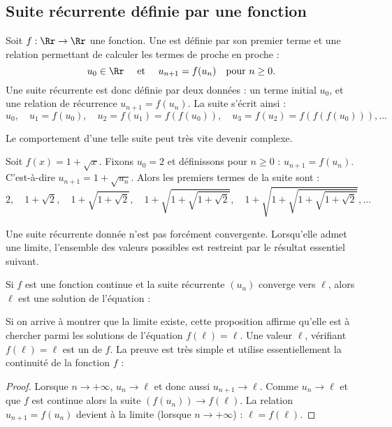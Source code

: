 \documentclass[class=report,crop=false]{standalone}
\begin{document}
\subsection{Suite récurrente définie par une fonction}

Soit $f : \Rr \to \Rr$ une fonction. Une  
est définie par son premier terme et une relation permettant de calculer les termes de proche en proche :
$$u_0 \in \Rr \quad \text{ et } \quad u_{n+1} = f(u_n) \ \ \text{ pour } n \ge 0.$$
Une suite récurrente est donc définie par deux données : un terme initial $u_0$, et une
relation de récurrence $u_{n+1}=f(u_n)$. La suite s'écrit ainsi :
$$u_0, \quad u_1 = f(u_0), \quad u_2 = f(u_1) =f(f(u_0)), \quad u_3 = f(u_2) =f(f(f(u_0))),\ldots$$

Le comportement d'une telle suite peut très vite devenir complexe.
\begin{exemple}
Soit $f(x)=1+\sqrt{x}$. Fixons $u_0= 2$ et définissons pour $n\ge0$ :
$u_{n+1}=f(u_n)  $. C'est-à-dire $u_{n+1}=1+\sqrt{u_n}$.
Alors les premiers termes de la suite sont :
$$2, \quad 1+\sqrt{2}, \quad 1+\sqrt{1+\sqrt{2}},  \quad 1+\sqrt{1+\sqrt{1+\sqrt{2}}},  \quad 1+\sqrt{1+\sqrt{1+\sqrt{1+\sqrt{2}}}},\ldots$$
\end{exemple}


Une suite récurrente donnée n'est pas forcément convergente. Lorsqu'elle admet une limite, l'ensemble des valeurs possibles est restreint par le résultat essentiel suivant.

\begin{proposition}
\label{prop:fll}
Si $f$ est une fonction continue et la suite récurrente $(u_n)$ converge vers $\ell$, alors
$\ell$ est une solution de l'équation :
\end{proposition}

Si on arrive à montrer que la limite existe, cette proposition affirme qu'elle est à chercher parmi les solutions de l'équation $f(\ell)=\ell$.
Une valeur $\ell$, vérifiant $f(\ell)=\ell$ est un  de $f$.
La preuve est très simple et %
utilise essentiellement la continuité de la fonction $f$ :
\begin{proof}
Lorsque $n\to +\infty$, $u_n\to \ell$ et donc aussi $u_{n+1} \to \ell$.
Comme $u_n\to \ell$ et que $f$ est continue alors
la suite $(f(u_n)) \to f(\ell)$.
La relation $u_{n+1} = f(u_n)$ devient à la limite (lorsque $n\to+\infty$) : $\ell=f(\ell)$.
\end{proof}
\end{document}
